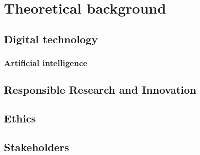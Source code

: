 \section{Theoretical background}
\label{sec:background}

\subsection{Digital technology}
\subsubsection{Artificial intelligence}

\subsection{Responsible Research and Innovation}
%

\subsection{Ethics}

\subsection{Stakeholders}
